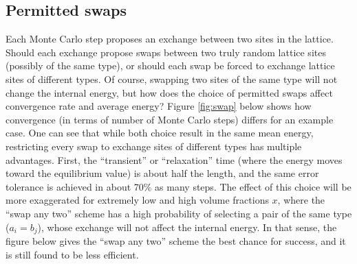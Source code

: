 \documentclass[10pt]{article}
\begin{document}
\subsection{Permitted swaps}
Each Monte Carlo step proposes an exchange between two sites in the lattice.
Should each exchange propose swaps between two truly random lattice sites (possibly of the same type), or should each swap be forced to exchange lattice sites of different types.
Of course, swapping two sites of the same type will not change the internal energy, but how does the choice of permitted swaps affect convergence rate and average energy?
Figure \ref{fig:swap} below shows how convergence (in terms of number of Monte Carlo steps) differs for an example case.
One can see that while both choice result in the same mean energy, restricting every swap to exchange sites of different types has multiple advantages.
First, the ``transient'' or ``relaxation'' time (where the energy moves toward the equilibrium value) is about half the length, and the same error tolerance is achieved in about 70\% as many steps.
The effect of this choice will be more exaggerated for extremely low and  high volume fractions $x$, where the ``swap any two'' scheme has a high probability of selecting a pair of the same type ($a_i = b_j$), whose exchange will not affect the internal energy.
In that sense, the figure below gives the ``swap any two'' scheme the best chance for success, and it is still found to be less efficient.
\end{document}
